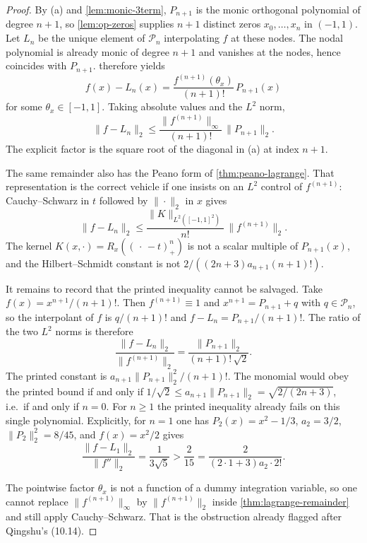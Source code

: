 \documentclass[11pt,a4paper]{article}
\begin{document}
\begin{proof}
By (a) and \cref{lem:monic-3term}, \(P_{n+1}\) is the monic orthogonal polynomial of degree \(n+1\), so \cref{lem:op-zeros} supplies \(n+1\) distinct zeros \(x_{0},\ldots,x_{n}\) in \((-1,1)\). Let \(L_{n}\) be the unique element of \(\mathcal{P}_{n}\) interpolating \(f\) at these nodes. The nodal polynomial is already monic of degree \(n+1\) and vanishes at the nodes, hence coincides with \(P_{n+1}\).  therefore yields
\[
f(x)-L_{n}(x)
=
\frac{f^{(n+1)}(\theta_{x})}{(n+1)!}\,P_{n+1}(x)
\]
for some \(\theta_{x}\in[-1,1]\). Taking absolute values and the \(L^{2}\) norm,
\[
\|f-L_{n}\|_{2}
\le
\frac{\|f^{(n+1)}\|_{\infty}}{(n+1)!}\,\|P_{n+1}\|_{2}.
\]
The explicit factor is the square root of the diagonal in (a) at index \(n+1\).

The same remainder also has the Peano form of \cref{thm:peano-lagrange}. That representation is the correct vehicle if one insists on an \(L^{2}\) control of \(f^{(n+1)}\): Cauchy--Schwarz in \(t\) followed by \(\|\cdot\|_{2}\) in \(x\) gives
\[
\|f-L_{n}\|_{2}
\le
\frac{\|K\|_{L^{2}([-1,1]^{2})}}{n!}\,\|f^{(n+1)}\|_{2}.
\]
The kernel \(K(x,\cdot)=R_{x}((\,\cdot\,-t)_{+}^{n})\) is not a scalar multiple of \(P_{n+1}(x)\), and the Hilbert--Schmidt constant is not \(2/((2n+3)a_{n+1}(n+1)!)\).

It remains to record that the printed inequality cannot be salvaged. Take \(f(x)=x^{n+1}/(n+1)!\). Then \(f^{(n+1)}\equiv 1\) and \(x^{n+1}=P_{n+1}+q\) with \(q\in\mathcal{P}_{n}\), so the interpolant of \(f\) is \(q/(n+1)!\) and \(f-L_{n}=P_{n+1}/(n+1)!\). The ratio of the two \(L^{2}\) norms is therefore
\[
\frac{\|f-L_{n}\|_{2}}{\|f^{(n+1)}\|_{2}}
=
\frac{\|P_{n+1}\|_{2}}{(n+1)!\,\sqrt{2}}.
\]
The printed constant is \(a_{n+1}\|P_{n+1}\|_{2}^{2}/(n+1)!\). The monomial would obey the printed bound if and only if \(1/\sqrt{2}\le a_{n+1}\|P_{n+1}\|_{2}=\sqrt{2/(2n+3)}\), i.e.\ if and only if \(n=0\). For \(n\ge 1\) the printed inequality already fails on this single polynomial. Explicitly, for \(n=1\) one has \(P_{2}(x)=x^{2}-1/3\), \(a_{2}=3/2\), \(\|P_{2}\|_{2}^{2}=8/45\), and \(f(x)=x^{2}/2\) gives
\[
\frac{\|f-L_{1}\|_{2}}{\|f''\|_{2}}
=
\frac{1}{3\sqrt{5}}
>
\frac{2}{15}
=
\frac{2}{(2\cdot 1+3)a_{2}\cdot 2!}.
\]

The pointwise factor \(\theta_{x}\) is not a function of a dummy integration variable, so one cannot replace \(\|f^{(n+1)}\|_{\infty}\) by \(\|f^{(n+1)}\|_{2}\) inside \cref{thm:lagrange-remainder} and still apply Cauchy--Schwarz. That is the obstruction already flagged after Qingshu's (10.14).
\end{proof}
\end{document}
